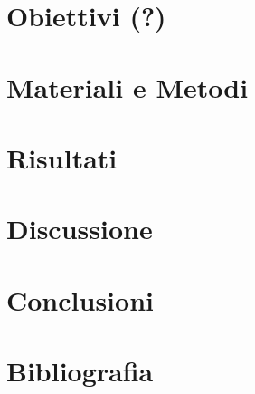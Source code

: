 \documentclass[11pt]{article}
\begin{document}
\section{Obiettivi  (?)}
\label{sec:org69a1c51}

\section{Materiali e Metodi}
\label{sec:orgc2b8fde}

\section{Risultati}
\label{sec:org7dc7428}

\section{Discussione}
\label{sec:org3c6e88a}

\section{Conclusioni}
\label{sec:orge48eb6c}


\section{Bibliografia}
\label{sec:orga34a4f5}
\end{document}
